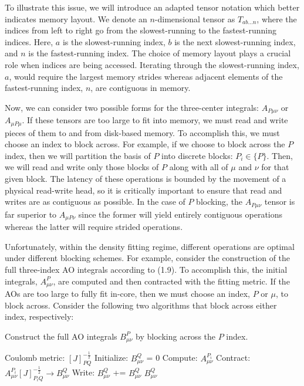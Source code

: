 To illustrate
this issue, we will introduce an adapted tensor notation which better indicates memory layout.
We denote an $n$-dimensional tensor as $T_{ab\hdots n}$, where the indices from left to right go from the slowest-running
to the fastest-running indices. Here, $a$ is the slowest-running index, $b$ is the next slowest-running
index, and $n$ is the fastest-running index. The choice of memory layout plays a crucial role when indices are being accessed.
Iterating through the slowest-running index, $a$, would require the largest memory strides whereas adjacent elements 
of the fastest-running index, $n$, are contiguous in memory. 

Now, we can consider two possible forms for the three-center integrals: $A_{P\mu\nu}$ or $A_{\mu P\mu}$.
If these tensors are too large to fit into memory, we must read and write pieces of them to and from disk-based memory.
To accomplish this, we must choose an index to block across. 
For example, if we choose to block across the $P$ index, then we will partition the basis of $P$ into discrete blocks: $P_i \in \{P\}$.
Then, we will read and write only those blocks of $P$ along with all of $\mu$ and $\nu$ for that given block.
The latency of these operations is
bounded by the movement of a physical read-write head, so it is critically important to ensure that read and writes are as
contiguous as possible. In the case of $P$ blocking, the $A_{P\mu\nu}$ tensor is far superior to $A_{\mu P \nu}$ since the 
former will yield entirely contiguous operations whereas the latter will require strided operations. 

Unfortunately, within the density fitting regime, different operations are optimal under different blocking schemes. For example,
consider the construction of the full three-index AO integrals according to (1.9). To accomplish this, 
the initial integrals, $A_{\mu \nu}^P$, are computed and then contracted with the fitting metric. If the AOs are too large to fully 
fit in-core, then we must choose an index, $P$ or $\mu$, to block across. Consider the following two algorithms
that block across either index, respectively:

\begin{algorithm}[H]
\caption{Construct the full AO integrals $B_{\mu \nu}^P$ by blocking across the $P$ index.}
\begin{algorithmic}
\REQUIRE Coulomb metric: $[J]_{PQ}^{-\frac{1}{2}}$
\STATE Initialize: $B_{\mu \nu}^Q$ = 0
    \STATE Compute:  $A_{\mu \nu}^{P_i}$
    \STATE Contract: $A_{\mu \nu}^{P_i} [J]_{P_iQ}^{-\frac{1}{2}} \rightarrow B_{\mu \nu}^Q$
    \STATE Write:    $B_{\mu \nu}^Q$ += $B_{\mu \nu}^Q$ 
\ENDFOR
\RETURN $B_{\mu \nu}^Q$
\end{algorithmic}
\end{algorithm}

